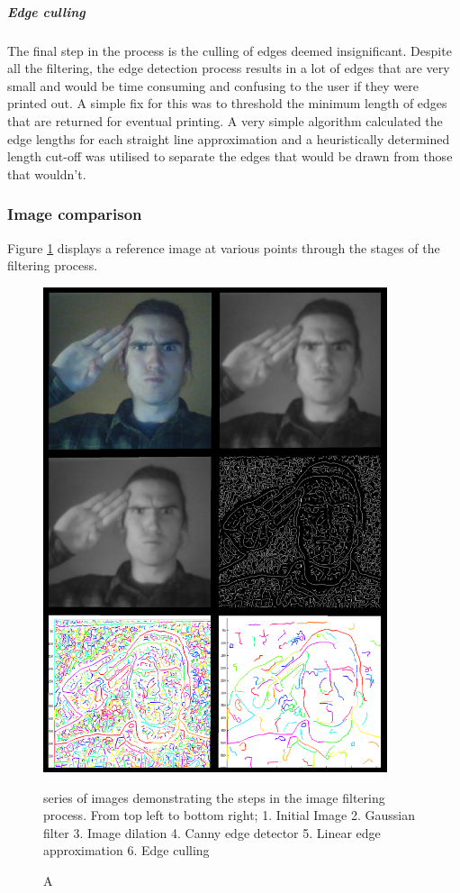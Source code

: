\subparagraph{Edge culling}
The final step in the process is the culling of edges deemed insignificant. Despite all the filtering, the edge detection process results in a lot of edges that are very small and would be time consuming and confusing to the user if they were printed out. A simple fix for this was to threshold the minimum length of edges that are returned for eventual printing. A very simple algorithm calculated the edge lengths for each straight line approximation and a heuristically determined length cut-off was utilised to separate the edges that would be drawn from those that wouldn't.
\subsubsection{Image comparison}
Figure \ref{fig:demo} displays a reference image at various points through the stages of the filtering process.

\begin{figure}
\centering
\includegraphics[width=0.9\textwidth]{figures/systemDesign/demo.png}
\caption[Image filtering process] A series of images demonstrating the steps in the image filtering process. From top left to bottom right; 1. Initial Image 2. Gaussian filter 3. Image dilation 4. Canny edge detector 5. Linear edge approximation 6. Edge culling {
\label{fig:demo}}
\end{figure}
